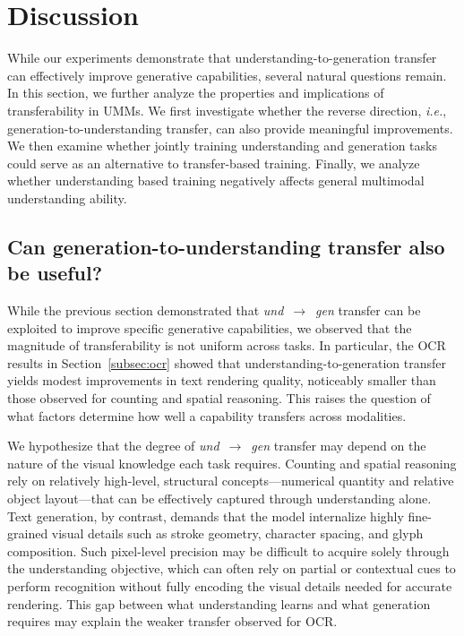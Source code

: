 \section{Discussion}

While our experiments demonstrate that understanding-to-generation transfer can effectively improve generative capabilities, several natural questions remain. In this section, we further analyze the properties and implications of transferability in UMMs. We first investigate whether the reverse direction, \textit{i.e.}, generation-to-understanding transfer, can also provide meaningful improvements. We then examine whether jointly training understanding and generation tasks could serve as an alternative to transfer-based training. Finally, we analyze whether understanding based training negatively affects general multimodal understanding ability.

\subsection{Can generation-to-understanding transfer also be useful?}
\label{sec:discuss_ocr}


While the previous section demonstrated that \textit{und}~$\rightarrow$~\textit{gen} transfer can be exploited to improve specific generative capabilities, we observed that the magnitude of transferability is not uniform across tasks. In particular, the OCR results in Section~\ref{subsec:ocr} showed that understanding-to-generation transfer yields modest improvements in text rendering quality, noticeably smaller than those observed for counting and spatial reasoning. This raises the question of what factors determine how well a capability transfers across modalities. 

We hypothesize that the degree of \textit{und}~$\rightarrow$~\textit{gen} transfer may depend on the nature of the visual knowledge each task requires. Counting and spatial reasoning rely on relatively high-level, structural concepts—numerical quantity and relative object layout—that can be effectively captured through understanding alone. Text generation, by contrast, demands that the model internalize highly fine-grained visual details such as stroke geometry, character spacing, and glyph composition. Such pixel-level precision may be difficult to acquire solely through the understanding objective, which can often rely on partial or contextual cues to perform recognition without fully encoding the visual details needed for accurate rendering. This gap between what understanding learns and what generation requires may explain the weaker transfer observed for OCR. 

